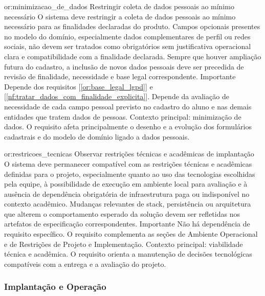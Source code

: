 \reqoutro
{or:minimizacao_de_dados}
{Restringir coleta de dados pessoais ao mínimo necessário}
{O sistema deve restringir a coleta de dados pessoais ao mínimo necessário para as finalidades declaradas do produto. Campos opcionais presentes no modelo do domínio, especialmente dados complementares de perfil ou redes sociais, não devem ser tratados como obrigatórios sem justificativa operacional clara e compatibilidade com a finalidade declarada. Sempre que houver ampliação futura do cadastro, a inclusão de novos dados pessoais deve ser precedida de revisão de finalidade, necessidade e base legal correspondente.}
{Importante}
{Depende dos requisitos [\ref{or:base_legal_lgpd}] e [\ref{nf:tratar_dados_com_finalidade_explicita}]. Depende da avaliação de necessidade de cada campo pessoal previsto no cadastro do aluno e nas demais entidades que tratem dados de pessoas.}
{Contexto principal: minimização de dados. O requisito afeta principalmente o desenho e a evolução dos formulários cadastrais e do modelo de domínio ligado a dados pessoais.}

\reqoutro
{or:restricoes_tecnicas}
{Observar restrições técnicas e acadêmicas de implantação}
{O sistema deve permanecer compatível com as restrições técnicas e acadêmicas definidas para o projeto, especialmente quanto ao uso das tecnologias escolhidas pela equipe, à possibilidade de execução em ambiente local para avaliação e à ausência de dependência obrigatória de infraestrutura paga ou indisponível no contexto acadêmico. Mudanças relevantes de stack, persistência ou arquitetura que alterem o comportamento esperado da solução devem ser refletidas nos artefatos de especificação correspondentes.}
{Importante}
{Não há dependência de requisito específico. O requisito complementa as seções de Ambiente Operacional e de Restrições de Projeto e Implementação.}
{Contexto principal: viabilidade técnica e acadêmica. O requisito orienta a manutenção de decisões tecnológicas compatíveis com a entrega e a avaliação do projeto.}

\subsubsection*{Implantação e Operação}

